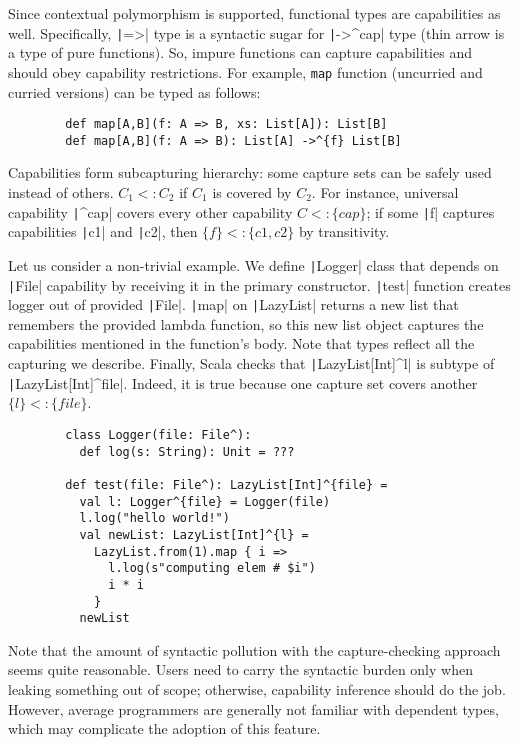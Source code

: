 \documentclass[conference]{IEEEtran}
\begin{document}
    Since contextual polymorphism is supported, functional types are capabilities as well.
    Specifically, \texttt|=>| type is a syntactic sugar for \texttt|->^{cap}| type (thin arrow is a type of pure functions).
    So, impure functions can capture capabilities and should obey capability restrictions.
    For example, \texttt{map} function (uncurried and curried versions) can be typed as follows:
    \begin{verbatim}
        def map[A,B](f: A => B, xs: List[A]): List[B]
        def map[A,B](f: A => B): List[A] ->^{f} List[B]
    \end{verbatim}

    Capabilities form subcapturing hierarchy: some capture sets can be safely used instead of others.
    $C_1 <: C_2$ if $C_1$ is covered by $C_2$.
    For instance, universal capability \texttt|^{cap}| covers every other capability $C <: \{cap\}$; if some \texttt|f| captures capabilities \texttt|c1| and \texttt|c2|, then $\{f\} <: \{c1, c2\}$ by transitivity.

    Let us consider a non-trivial example.
    We define \texttt|Logger| class that depends on \texttt|File| capability by receiving it in the primary constructor.
    \texttt|test| function creates logger out of provided \texttt|File|.
    \texttt|map| on \texttt|LazyList| returns a new list that remembers the provided lambda function, so this new list object captures the capabilities mentioned in the function's body.
    Note that types reflect all the capturing we describe.
    Finally, Scala checks that \texttt|LazyList[Int]^{l}| is subtype of \texttt|LazyList[Int]^{file}|.
    Indeed, it is true because one capture set covers another $\{l\} <: \{file\}$.
    \begin{verbatim}
        class Logger(file: File^):
          def log(s: String): Unit = ???

        def test(file: File^): LazyList[Int]^{file} =
          val l: Logger^{file} = Logger(file)
          l.log("hello world!")
          val newList: LazyList[Int]^{l} =
            LazyList.from(1).map { i =>
              l.log(s"computing elem # $i")
              i * i
            }
          newList
    \end{verbatim}

    Note that the amount of syntactic pollution with the capture-checking approach seems quite reasonable.
    Users need to carry the syntactic burden only when leaking something out of scope; otherwise, capability inference should do the job.
    However, average programmers are generally not familiar with dependent types, which may complicate the adoption of this feature.
\end{document}
